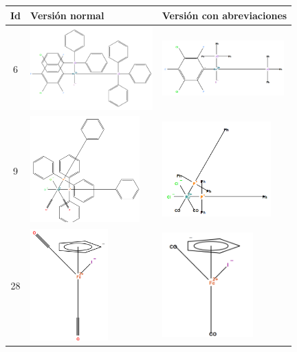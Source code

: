 \begin{table}[h!]
    \centering
    \begin{tabular}{c>{\centering}m{5cm}>{\centering\arraybackslash}m{5.9cm}}
        \toprule
        \textbf{Id} & \textbf{Versión normal} & \textbf{Versión con abreviaciones} \\
        \midrule
        6 &
        \includegraphics[width=4.7cm]{imagenes/resultados/moleculas/mol6.png} & \includegraphics[width=4.7cm]{imagenes/resultados/moleculas/mol6_ALIAS.png} \\
        \midrule
        9 &
       \includegraphics[width=4.2cm]{imagenes/resultados/moleculas/mol9.png} & \includegraphics[width=4.2cm]{imagenes/resultados/moleculas/mol9_alias.png} \\ 
        \midrule
        28 &
        \includegraphics[width=3cm]{imagenes/resultados/moleculas/iron(II).png} & \includegraphics[width=3.5cm]{imagenes/resultados/moleculas/iron(II)_alias.png} \\

\end{tabular}
\end{table}
